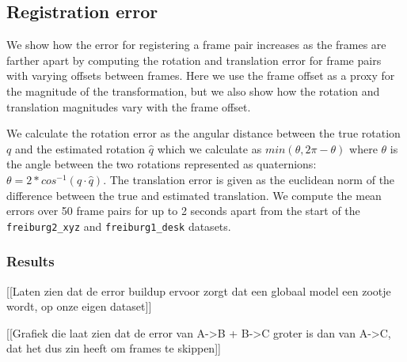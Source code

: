 \documentclass[a4paper]{article}
\begin{document}
\subsection{Registration error}
\label{registration_error}

We show how the error for registering a frame pair increases as the frames are farther apart by computing the rotation and translation error for frame pairs with varying offsets between frames. Here we use the frame offset as a proxy for the magnitude of the transformation, but we also show how the rotation and translation magnitudes vary with the frame offset.

We calculate the rotation error as the angular distance between the true rotation $q$ and the estimated rotation $\hat q$ which we calculate as $min(\theta, 2\pi - \theta)$ where $\theta$ is the angle between the two rotations represented as quaternions: $\theta = 2 * cos^{-1}(q \cdot \hat q)$. %
The translation error is given as the euclidean norm of the difference between the true and estimated translation. We compute the mean errors over 50 frame pairs for up to 2 seconds apart from the start of the \texttt{freiburg2\_xyz} and \texttt{freiburg1\_desk} datasets.

\subsubsection{Results}



[[Laten zien dat de error buildup ervoor zorgt dat een globaal model een zootje wordt, op onze eigen dataset]]

[[Grafiek die laat zien dat de error van A->B + B->C groter is dan van A->C, dat het dus zin heeft om frames te skippen]]
\end{document}
